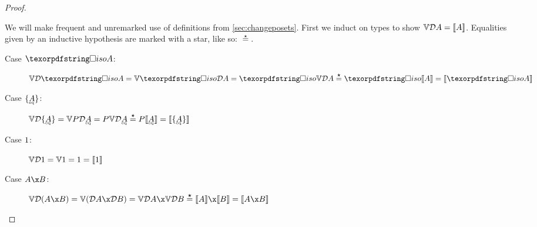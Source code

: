\documentclass[nomarginums]{rntz}\usepackage[tablet]{fantasy}%
\begin{document}

\thmForget*
\begin{proof}\label{proof:forget}

  We will make frequent and unremarked use of definitions from
  \cref{sec:changeposets}. First we induct on types to show $\mathbb{V}{\mathcal{D} A} =
  \llbracket{A}\rrbracket$. Equalities given by an inductive hypothesis are marked with a star,
  like so: $\stareq$.

  \begin{description}
    \item[Case $\isof A$:] \(\vals{\incdens{\isof A}}
      = \vals{\discof{\incdens A}}
      = \isof{\vals{\incdens A}} \stareq \isof{\den A}
      = \den{\isof A} \)


    \item[Case $\tset{\eqt A}$:]
      \(\vals{\incdens{\tset{\eqt A}}}
      = \vals{\pfinof{\incdens{\eqt A}}}
      = \pfinof{\vals{\incdens{\eqt A}}}
      \stareq \pfinof{\den{\eqt A}}
      = \den{\tset{\eqt A}} \)


    \item[Case $1$:] \(\mathbb{V}{\mathcal{D} 1} = \mathbb{V}1 = 1 = \llbracket{1}\rrbracket\)

    \item[Case $A \x B$:] \(\vals{\incden{A \x B}}
      = \vals{(\incdens A \x \incdens B)}
      = \vals{\incdens A} \x \vals{\incdens B}
      \stareq \den{A} \x \den{B}
      = \den{A \x B} \)


\end{description}
\end{proof}
\end{document}
